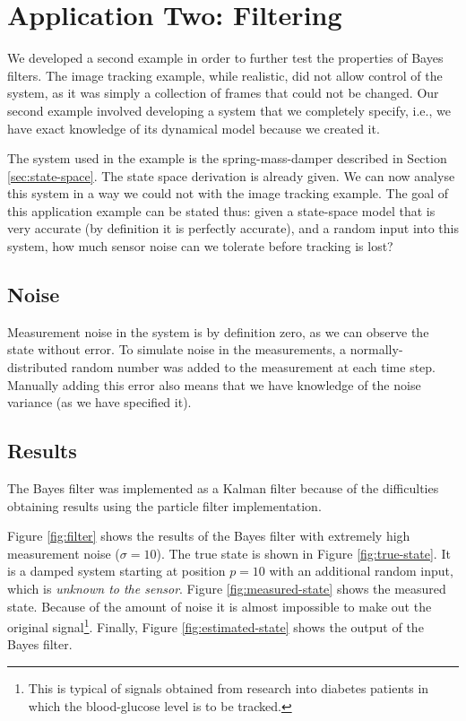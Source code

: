 \section{Application Two: Filtering}
We developed a second example in order to further test the properties of Bayes
filters. The image tracking example, while realistic, did not allow control of
the system, as it was simply a collection of frames that could not be changed.
Our second example involved developing a system that we completely specify, i.e.,
we have exact knowledge of its dynamical model because we created it.

The system used in the example is the spring-mass-damper described in Section
\ref{sec:state-space}. The state space derivation is already given. We can now
analyse this system in a way we could not with the image tracking example. The
goal of this application example can be stated thus: given a state-space model that is
very accurate (by definition it is perfectly accurate), and a random input
into this system, how much sensor noise can we tolerate before tracking is lost?

\subsection{Noise}
Measurement noise in the system is by definition zero, as we can observe the
state without error. To simulate noise in the measurements, a normally-distributed
random number was added to the measurement at each time step. Manually adding this
error also means that we have knowledge of the noise variance (as we have
specified it).

\subsection{Results}
The Bayes filter was implemented as a Kalman filter because of the difficulties
obtaining results using the particle filter implementation.

Figure \ref{fig:filter} shows the results of the Bayes filter with extremely
high measurement noise ($\sigma = 10$). The true state is shown in Figure
\ref{fig:true-state}. It is a damped system starting at position $p = 10$ with
an additional random input, which is \emph{unknown to the sensor}. Figure \ref{fig:measured-state}
shows the measured state. Because of the amount of noise it is almost impossible
to make out the original signal\footnote{This is typical of signals obtained
from research into diabetes patients in which the blood-glucose level is to be
tracked.}. Finally,
Figure \ref{fig:estimated-state} shows the output of the Bayes filter.


